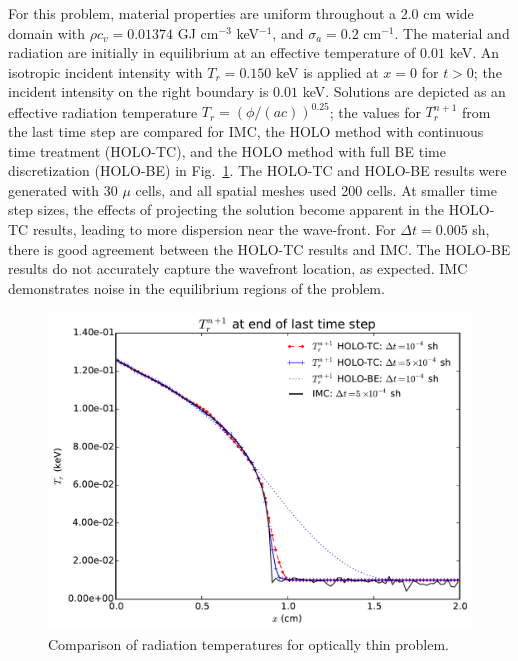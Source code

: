 \documentclass{anstrans}
\newcommand{\invcm}[0]{cm$^{-1}$}
\begin{document}
For this problem, material properties
are uniform throughout a 2.0 cm wide domain with $\rho c_v = 0.01374$ GJ cm$^{-3}$
keV$^{-1}$, and $\sigma_a=0.2$ \invcm.  
The material and radiation are initially in equilibrium at an effective temperature of $0.01$ keV.
An isotropic incident intensity with $T_r = 0.150$ keV is applied
at $x=0$ for $t>0$; the incident intensity on the right boundary is $0.01$ keV.
 Solutions are depicted as an effective radiation temperature
 $T_r=\left(\phi/(ac)\right)^{0.25}$; the values for $T_r^{n+1}$ from the last
 time step are compared for IMC, the HOLO method with continuous time treatment (HOLO-TC), and
 the HOLO method with full BE time discretization (HOLO-BE) in
Fig.~\ref{fig:thin_temp_compare}.  The HOLO-TC and HOLO-BE results were generated with 30
$\mu$ cells, and all spatial meshes used 200 cells.  At smaller time step sizes, the
effects of projecting the solution become apparent in the HOLO-TC results, leading to more
dispersion near the wave-front.  For $\Delta t=0.005$ sh, there is good agreement between
the HOLO-TC results and IMC.  The HOLO-BE results do not accurately capture
the wavefront location, as expected. IMC demonstrates noise in the equilibrium regions of the
problem.

\begin{figure}[H]
  \centering
    \includegraphics[width=\linewidth]{thin_temp_compare.pdf}
    \caption{\label{fig:thin_temp_compare} Comparison of radiation temperatures for optically thin
        problem. }
\end{figure}
\end{document}
